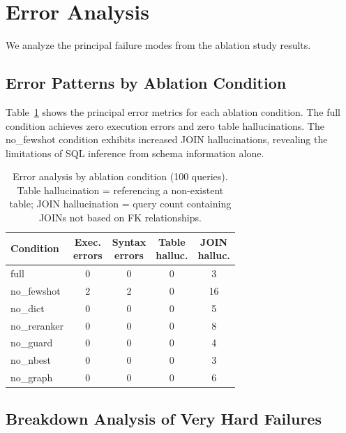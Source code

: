 \documentclass{npj-compt.mater}
\begin{document}
\section{Error Analysis}
\label{sec:error_analysis}

We analyze the principal failure modes from the ablation study results.

\subsection{Error Patterns by Ablation Condition}

Table~\ref{tab:error_analysis} shows the principal error metrics
for each ablation condition.
The full condition achieves zero execution errors and zero table
hallucinations.
The no\_fewshot condition exhibits increased JOIN hallucinations,
revealing the limitations of SQL inference from schema information
alone.

\begin{table}[t]
  \centering
  \caption{Error analysis by ablation condition (100 queries).
  Table hallucination = referencing a non-existent table;
  JOIN hallucination = query count containing JOINs not based
  on FK relationships.}
  \label{tab:error_analysis}
  \small
  \begin{tabular}{lcccc}
    \toprule
    Condition & \shortstack{Exec.\\errors} & \shortstack{Syntax\\errors} & \shortstack{Table\\halluc.} & \shortstack{JOIN\\halluc.} \\
    \midrule
    full          & 0 & 0 & 0 & 3 \\
    no\_fewshot   & 2 & 2 & 0 & 16 \\
    no\_dict      & 0 & 0 & 0 & 5 \\
    no\_reranker  & 0 & 0 & 0 & 8 \\
    no\_guard     & 0 & 0 & 0 & 4 \\
    no\_nbest     & 0 & 0 & 0 & 3 \\
    no\_graph     & 0 & 0 & 0 & 6 \\
    \bottomrule
  \end{tabular}
\end{table}

\subsection{Breakdown Analysis of Very Hard Failures}
\end{document}
